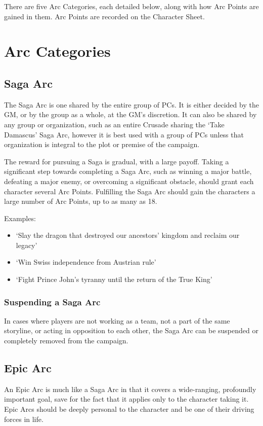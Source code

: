 \documentclass[oneside,11pt,english]{book}
\begin{document}
There are five Arc Categories, each detailed below, along with how Arc Points are gained in them. Arc 
Points are recorded on the Character Sheet. 
\section{Arc Categories}

 

\subsection{Saga Arc}
The Saga Arc is one shared by the entire group of PCs. It is either decided by the GM, or by the group as 
a whole, at the GM’s discretion. It can also be shared by any group or organization, such as an entire 
Crusade sharing the ‘Take Damascus’ Saga Arc, however it is best used with a group of PCs unless that 
organization is integral to the plot or premise of the campaign. 
 

The reward for pursuing a Saga is gradual, with a large payoff. Taking a significant step towards 
completing a Saga Arc, such as winning a major battle, defeating a major enemy, or overcoming a 
significant obstacle, should grant each character several Arc Points. Fulfilling the Saga Arc should gain 
the characters a large number of Arc Points, up to as many as 18. 


Examples:
\begin{itemize}
\item ‘Slay the dragon that destroyed our ancestors’ kingdom and reclaim our legacy’ 
\item ‘Win Swiss independence from Austrian rule’ 
\item ‘Fight Prince John’s tyranny until the return of the True King’ 
\end{itemize} 
 
\subsubsection{Suspending a Saga Arc}
In cases where players are not working as a team, not a part of the same storyline, or acting in opposition 
to each other, the Saga Arc can be suspended or completely removed from the campaign. 

 

\subsection{Epic Arc} 
An Epic Arc is much like a Saga Arc in that it covers a wide-ranging, profoundly important goal, save for 
the fact that it applies only to the character taking it. Epic Arcs should be deeply personal to the character 
and be one of their driving forces in life. 
\end{document}
